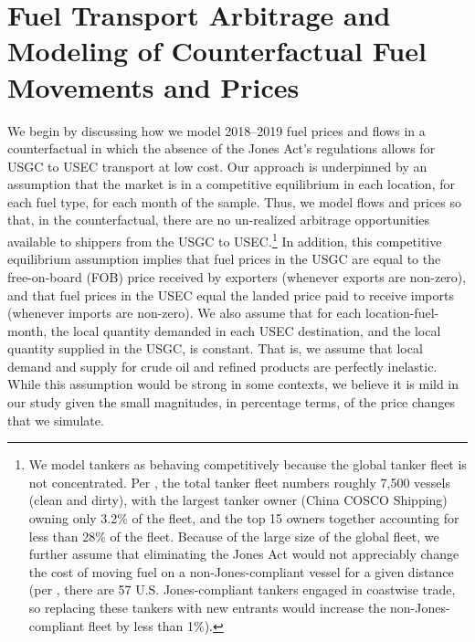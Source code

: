\documentclass[12pt]{article}
\begin{document}
\section{Fuel Transport Arbitrage and Modeling of Counterfactual Fuel Movements and Prices \label{sec:Model}}

We begin by discussing how we model 2018--2019 fuel prices and flows in a counterfactual in which the absence of the Jones Act's regulations allows for USGC to USEC transport at low cost. Our approach is underpinned by an assumption that the market is in a competitive equilibrium in each location, for each fuel type, for each month of the sample. Thus, we model flows and prices so that, in the counterfactual, there are no un-realized arbitrage opportunities available to shippers from the USGC to USEC.\footnote{We model tankers as behaving competitively because the global tanker fleet is not concentrated. Per \cite{CRS2024}, the total tanker fleet numbers roughly 7,500 vessels (clean and dirty), with the largest tanker owner (China COSCO Shipping) owning only 3.2\% of the fleet, and the top 15 owners together accounting for less than 28\% of the fleet. Because of the large size of the global fleet, we further assume that eliminating the Jones Act would not appreciably change the cost of moving fuel on a non-Jones-compliant vessel for a given distance (per \cite{CRS2019}, there are 57 U.S. Jones-compliant tankers engaged in coastwise trade, so replacing these tankers with new entrants would increase the non-Jones-compliant fleet by less than 1\%).\label{fn:fleetcomp}} In addition, this competitive equilibrium assumption implies that fuel prices in the USGC are equal to the free-on-board (FOB) price received by exporters (whenever exports are non-zero), and that fuel prices in the USEC equal the landed price paid to receive imports (whenever imports are non-zero). We also assume that for each location-fuel-month, the local quantity demanded in each USEC destination, and the local quantity supplied in the USGC, is constant. That is, we assume that local demand and supply for crude oil and refined products are perfectly inelastic. While this assumption would be strong in some contexts, we believe it is mild in our study given the small magnitudes, in percentage terms, of the price changes that we simulate.
\end{document}
